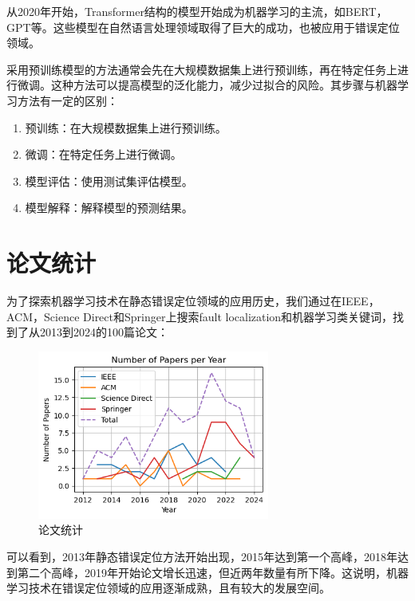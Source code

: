 从2020年开始，Transformer结构的模型开始成为机器学习的主流，如BERT，GPT等。这些模型在自然语言处理领域取得了巨大的成功，也被应用于错误定位领域。

采用预训练模型的方法通常会先在大规模数据集上进行预训练，再在特定任务上进行微调。这种方法可以提高模型的泛化能力，减少过拟合的风险。其步骤与机器学习方法有一定的区别：
\begin{enumerate}
    \item 预训练：在大规模数据集上进行预训练。
    \item 微调：在特定任务上进行微调。
    \item 模型评估：使用测试集评估模型。
    \item 模型解释：解释模型的预测结果。
\end{enumerate}
\section{论文统计}
为了探索机器学习技术在静态错误定位领域的应用历史，我们通过在IEEE，ACM，Science Direct和Springer上搜索fault localization和机器学习类关键词，找到了从2013到2024的100篇论文：
\begin{figure}[H]
    \centering
    \includegraphics[width=3in]{sections/figs/articles.png}
    \caption{\label{fig1111} \xiaowuhao \hei 论文统计}
\end{figure}

可以看到，2013年静态错误定位方法开始出现，2015年达到第一个高峰，2018年达到第二个高峰，2019年开始论文增长迅速，但近两年数量有所下降。这说明，机器学习技术在错误定位领域的应用逐渐成熟，且有较大的发展空间。
